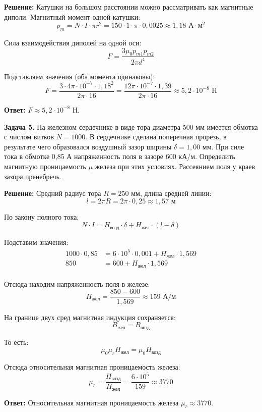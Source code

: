 \documentclass[10pt]{article}
\begin{document}
\textbf{Решение:}
Катушки на большом расстоянии можно рассматривать как магнитные диполи. 
Магнитный момент одной катушки:
$$p_m = N \cdot I \cdot \pi r^2 = 150 \cdot 1 \cdot \pi \cdot 0,0025 \approx 1,18 \text{ А}\cdot\text{м}^2$$

Сила взаимодействия диполей на одной оси:
$$F = \frac{3\mu_0 p_{m1} p_{m2}}{2\pi d^4}$$

Подставляем значения (оба момента одинаковы):
$$F = \frac{3 \cdot 4\pi \cdot 10^{-7} \cdot 1,18^2}{2\pi \cdot 16} = \frac{12\pi \cdot 10^{-7} \cdot 1,39}{2\pi \cdot 16} \approx 5,2 \cdot 10^{-8} \text{ Н}$$

\textbf{Ответ:} $F \approx 5,2 \cdot 10^{-8}$ Н.

\vspace{0.8cm}

\textbf{Задача 5.} На железном сердечнике в виде тора диаметра 500 мм имеется обмотка с числом витков $N=1000$. В сердечнике сделана поперечная прорезь, в результате чего образовался воздушный зазор ширины $\delta=1,00$ мм. При силе тока в обмотке 0,85 А напряженность поля в зазоре 600 кА/м. Определить магнитную проницаемость $\mu$ железа при этих условиях. Рассеянием поля у краев зазора пренебречь.

\textbf{Решение:}
Средний радиус тора $R = 250$ мм, длина средней линии:
$$l = 2\pi R = 2\pi \cdot 0,25 \approx 1,57 \text{ м}$$

По закону полного тока:
$$N \cdot I = H_{\text{возд}} \cdot \delta + H_{\text{жел}} \cdot (l-\delta)$$

Подставим значения:
\begin{align*}
1000 \cdot 0,85 &= 6 \cdot 10^5 \cdot 0,001 + H_{\text{жел}} \cdot 1,569 \\
850 &= 600 + H_{\text{жел}} \cdot 1,569 \\
\end{align*}

Отсюда находим напряженность поля в железе:
$$H_{\text{жел}} = \frac{850 - 600}{1,569} \approx 159 \text{ А/м}$$

На границе двух сред магнитная индукция сохраняется:
$$B_{\text{жел}} = B_{\text{возд}}$$

То есть:
$$\mu_0 \mu_r H_{\text{жел}} = \mu_0 H_{\text{возд}}$$

Отсюда относительная магнитная проницаемость железа:
$$\mu_r = \frac{H_{\text{возд}}}{H_{\text{жел}}} = \frac{6 \cdot 10^5}{159} \approx 3770$$

\textbf{Ответ:} Относительная магнитная проницаемость железа $\mu_r \approx 3770$.
\end{document}
